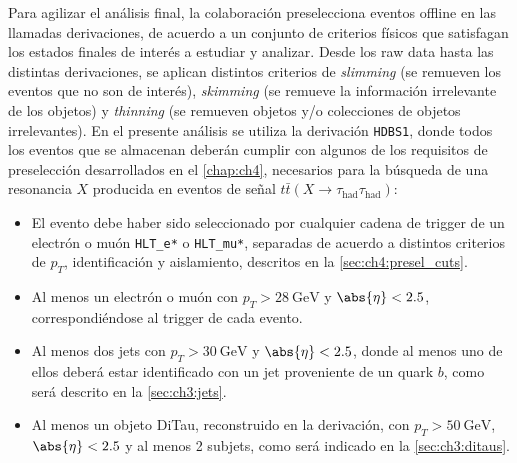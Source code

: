 Para agilizar el análisis final, la colaboración preselecciona eventos offline en las llamadas derivaciones, de acuerdo a un conjunto de criterios físicos que satisfagan los estados finales de interés a estudiar y analizar. Desde los raw data hasta las distintas derivaciones, se aplican distintos criterios de \textit{slimming} (se remueven los eventos que no son de interés), \textit{skimming} (se remueve la información irrelevante de los objetos) y \textit{thinning} (se remueven objetos y/o colecciones de objetos irrelevantes). En el presente análisis se utiliza la derivación \texttt{HDBS1}, donde todos los eventos que se almacenan deberán cumplir con algunos de los requisitos de preselección desarrollados en el \cref{chap:ch4}, necesarios para la búsqueda de una resonancia $X$ producida en eventos de señal $t\bar{t}(X \to \tau_{\text{had}} \tau_{\text{had}})$:
\begin{itemize}
    \item El evento debe haber sido seleccionado por cualquier cadena de trigger de un electrón o muón \texttt{HLT\_e*} o \texttt{HLT\_mu*}, separadas de acuerdo a distintos criterios de $p_T$, identificación y aislamiento, descritos en la \cref{sec:ch4:presel_cuts}.
    \item Al menos un electrón o muón con $p_T > \SI{28}{\GeV}$ y $\abs{\eta} < 2.5$, correspondiéndose al trigger de cada evento.
    \item Al menos dos jets con $p_T > \SI{30}{\GeV}$ y $\abs{\eta} < 2.5$, donde al menos uno de ellos deberá estar identificado con un jet proveniente de un quark $b$, como será descrito en la \cref{sec:ch3:jets}.
    \item Al menos un objeto DiTau, reconstruido en la derivación, con $p_T > \SI{50}{\GeV}$, $\abs{\eta} < 2.5$ y al menos 2 subjets, como será indicado en la \cref{sec:ch3:ditaus}.
\end{itemize}

\cleardoublepage{}